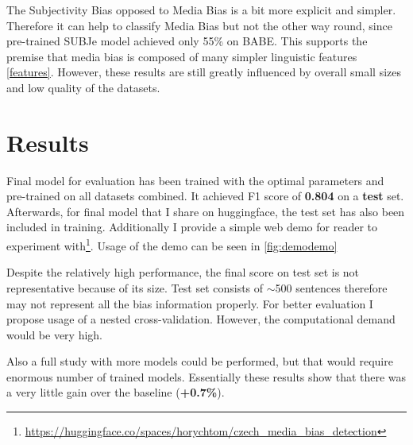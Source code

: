 The Subjectivity Bias opposed to Media Bias is a bit more explicit and simpler. Therefore it can help to classify Media Bias but not the other way round, since pre-trained SUBJe model achieved only 55\% on BABE. This supports the premise that media bias is composed of many simpler linguistic features \ref{features}. However, these results are still greatly influenced by overall small sizes and low quality of the datasets.




\section{Results}
Final model for evaluation has been trained with the optimal parameters and pre-trained on all datasets combined. It achieved F1 score of \textbf{0.804} on a \textbf{test} set. Afterwards, for final model that I share on huggingface, the test set has also been included in training. Additionally I provide a simple web demo for reader to experiment with\footnote{\url{https://huggingface.co/spaces/horychtom/czech_media_bias_detection}}. Usage of the demo can be seen in \ref{fig:demodemo}

\begin{figure}
\end{figure}


Despite the relatively high performance, the final score on test set is not representative because of its size. Test set consists of $\sim$500 sentences therefore may not represent all the bias information properly. For better evaluation I propose usage of a nested cross-validation. However, the computational demand would be very high. 

Also a full study with more models could be performed, but that would require enormous number of trained models. Essentially these results show that there was a very little gain over the baseline (\textbf{+0.7\%}).

